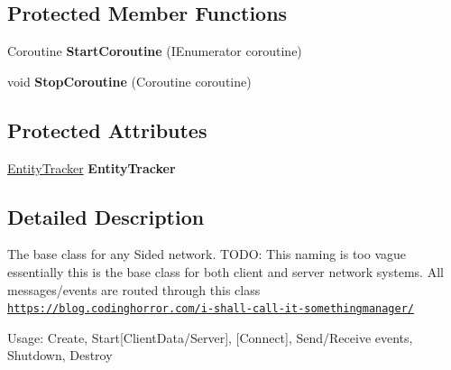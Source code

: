 \subsection*{Protected Member Functions}
\begin{DoxyCompactItemize}
\item 
\hypertarget{class_skyrates_1_1_common_1_1_network_1_1_network_common_a2ba453467379317d64434381a3f88790}{Coroutine {\bfseries Start\-Coroutine} (I\-Enumerator coroutine)}\label{class_skyrates_1_1_common_1_1_network_1_1_network_common_a2ba453467379317d64434381a3f88790}

\item 
\hypertarget{class_skyrates_1_1_common_1_1_network_1_1_network_common_a75687f01ff0549a508696e38e55bbb32}{void {\bfseries Stop\-Coroutine} (Coroutine coroutine)}\label{class_skyrates_1_1_common_1_1_network_1_1_network_common_a75687f01ff0549a508696e38e55bbb32}

\end{DoxyCompactItemize}
\subsection*{Protected Attributes}
\begin{DoxyCompactItemize}
\item 
\hypertarget{class_skyrates_1_1_common_1_1_network_1_1_network_common_a97cfa2e4a42597caef5376bff59e84e9}{\hyperlink{class_skyrates_1_1_common_1_1_entity_1_1_entity_tracker}{Entity\-Tracker} {\bfseries Entity\-Tracker}}\label{class_skyrates_1_1_common_1_1_network_1_1_network_common_a97cfa2e4a42597caef5376bff59e84e9}

\end{DoxyCompactItemize}


\subsection{Detailed Description}
The base class for any Sided network. T\-O\-D\-O\-: This naming is too vague essentially this is the base class for both client and server network systems. All messages/events are routed through this class \href{https://blog.codinghorror.com/i-shall-call-it-somethingmanager/}{\tt https\-://blog.\-codinghorror.\-com/i-\/shall-\/call-\/it-\/somethingmanager/} 

Usage\-: Create, Start\mbox{[}Client\-Data/\-Server\mbox{]}, \mbox{[}Connect\mbox{]}, Send/\-Receive events, Shutdown, Destroy

